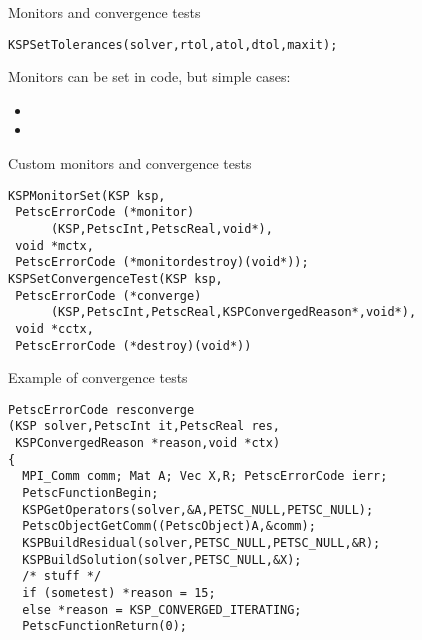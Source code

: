 \begin{numberedframe}{Monitors and convergence tests}
\begin{lstlisting}
KSPSetTolerances(solver,rtol,atol,dtol,maxit);
\end{lstlisting}
Monitors can be set in code, but simple cases:
\begin{itemize}
\item {}
\item {}
\end{itemize}
\end{numberedframe}

\begin{numberedframe}{Custom monitors and convergence tests}
\begin{lstlisting}
KSPMonitorSet(KSP ksp,
 PetscErrorCode (*monitor)
      (KSP,PetscInt,PetscReal,void*),
 void *mctx,
 PetscErrorCode (*monitordestroy)(void*));
KSPSetConvergenceTest(KSP ksp,
 PetscErrorCode (*converge)
      (KSP,PetscInt,PetscReal,KSPConvergedReason*,void*),
 void *cctx,
 PetscErrorCode (*destroy)(void*))
\end{lstlisting}
\end{numberedframe}

\begin{numberedframe}{Example of convergence tests}
\begin{lstlisting}
PetscErrorCode resconverge
(KSP solver,PetscInt it,PetscReal res,
 KSPConvergedReason *reason,void *ctx)
{
  MPI_Comm comm; Mat A; Vec X,R; PetscErrorCode ierr;
  PetscFunctionBegin;
  KSPGetOperators(solver,&A,PETSC_NULL,PETSC_NULL);
  PetscObjectGetComm((PetscObject)A,&comm); 
  KSPBuildResidual(solver,PETSC_NULL,PETSC_NULL,&R);
  KSPBuildSolution(solver,PETSC_NULL,&X); 
  /* stuff */
  if (sometest) *reason = 15;
  else *reason = KSP_CONVERGED_ITERATING;
  PetscFunctionReturn(0);
\end{lstlisting}
\end{numberedframe}



